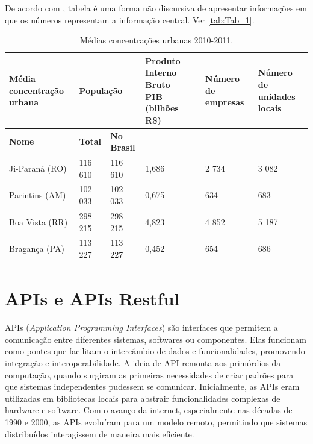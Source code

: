 
De acordo com \textcite{ibge1993}, tabela é uma forma não discursiva de apresentar informações em que os números representam a informação central. Ver \autoref{tab:Tab_1}.

\begin{table}[htb]
	\ABNTEXfontereduzida
	\caption{\label{tab:Tab_1}Médias concentrações urbanas 2010-2011.}
	\begin{tabular}{@{}p{3.0cm}p{1.5cm}p{2cm}p{2.5cm}p{2.5cm}p{2.5cm}@{}}
		\toprule
		\textbf{Média concentração urbana} & \multicolumn{2}{l}{\textbf{População}} & \textbf{Produto Interno Bruto – PIB (bilhões R\$)} & \textbf{Número de empresas} & \textbf{Número de unidades locais} \\ \midrule
		\textbf{Nome}                      & \textbf{Total}   & \textbf{No Brasil}  &                                                   &                             & \\
		Ji-Paraná (RO)                     & 116 610          & 116 610             & 1,686                                             & 2 734                       & 3 082 \\
		Parintins (AM)                     & 102 033          & 102 033             & 0,675                                             & 634                         & 683 \\
		Boa Vista (RR)                     & 298 215          & 298 215             & 4,823                                             & 4 852                       & 5 187 \\
		Bragança (PA)                      & 113 227          & 113 227             & 0,452                                             & 654                         & 686 \\ \bottomrule
	\end{tabular}
\end{table}

\section{APIs e APIs Restful}

APIs (\textit{Application Programming Interfaces}) são interfaces que permitem a comunicação entre diferentes sistemas, softwares ou componentes. Elas funcionam como pontes que facilitam o intercâmbio de dados e funcionalidades, promovendo integração e interoperabilidade. A ideia de API remonta aos primórdios da computação, quando surgiram as primeiras necessidades de criar padrões para que sistemas independentes pudessem se comunicar. Inicialmente, as APIs eram utilizadas em bibliotecas locais para abstrair funcionalidades complexas de hardware e software. Com o avanço da internet, especialmente nas décadas de 1990 e 2000, as APIs evoluíram para um modelo remoto, permitindo que sistemas distribuídos interagissem de maneira mais eficiente.

